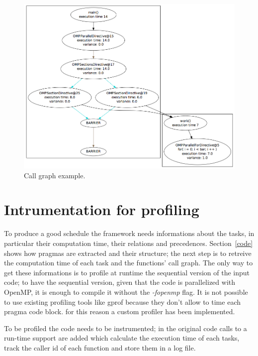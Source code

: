 \documentclass[a4paper,12pt,oneside]{book}
\begin{document}
\begin{figure}[H]
\centering
\includegraphics[scale=0.5]{call_graph.png}
\caption{Call graph example.}
\label{call_graph}
\end{figure}


\section{Intrumentation for profiling}

To produce a good schedule the framework needs informations about the tasks, in particular their computation time, their relations and precedences. Section~\ref{code} shows how pragmas are extracted and their structure; the next step is to retreive the computation time of each task and the functions’ call graph. The only way to get these informations is to profile at run\-time the sequential version of the input code; to have the sequential version, given that the code is parallelized with OpenMP, it is enough to compile it without the \emph{-fopenmp} flag. It is not possible to use existing profiling tools like gprof because they don't allow to time each pragma code block. for this reason a custom profiler has been implemented.

To be profiled the code needs to be instrumented; in the original code calls to a run-time support are added which calculate the execution time of each tasks, track the caller id of each function and store them in a log file. 
\end{document}
